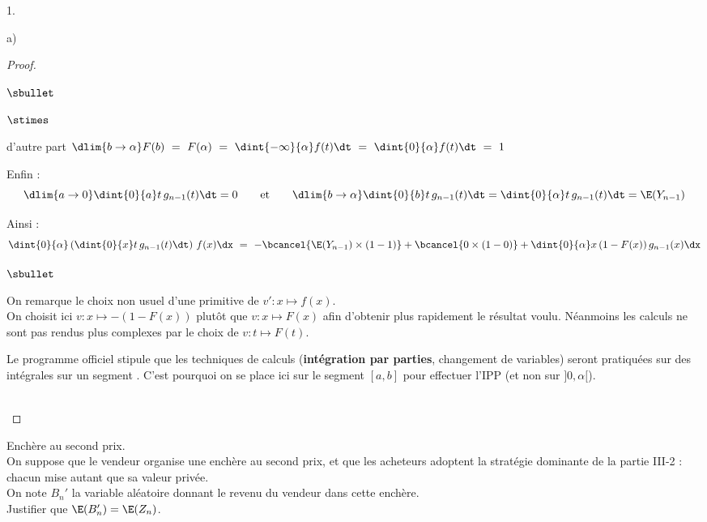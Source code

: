 \begin{noliste}{1.}
\begin{noliste}{a)}
\begin{proof}
\begin{noliste}{$\sbullet$}
\begin{noliste}{$\stimes$}
	\item d'autre part $\dlim{b\to \alpha} F(b) \ = \ F(\alpha) \ = 
	\ \dint{-\infty}{\alpha} f(t) \dt \ = \ 
	\dint{0}{\alpha} f(t) \dt \ = \ 1$
      \end{noliste}
      Enfin :
      \[
        \dlim{a\to 0} \dint{0}{a} t \, g_{n-1}(t) \dt = 0 \qquad 
        \text{et} \qquad \dlim{b\to \alpha} \dint{0}{b} t \, g_{n-1}(t) 
        \dt = \dint{0}{\alpha} t \, g_{n-1}(t) \dt = 
        \E(Y_{n-1})
      \]
      \item Ainsi : 
      \[
        \dint{0}{\alpha} \left(\dint{0}{x} t \, g_{n-1}(t) \dt \right)
        \, f(x) \dx \ = \ -\bcancel{\E(Y_{n-1}) \times (1-1)} + 
        \bcancel{0 \times (1-0)} + \dint{0}{\alpha} x \, (1-F(x))
        \, g_{n-1}(x) \dx
      \]
      \end{noliste}
      \conc{On en déduit : $\E(B_n) \ = \ n \, \dint{0}{\alpha} x \, 
      (1-F(x)) \, g_{n-1}(x) \dx$.}
      
      \begin{remark}
      \begin{noliste}{$\sbullet$}
        \item On remarque le choix non usuel d'une primitive de 
        $v': x \mapsto f(x)$.\\
        On choisit ici $v : x \mapsto -(1-F(x))$ plutôt que 
        $v:x \mapsto F(x)$ afin d'obtenir plus rapidement le résultat
        voulu. Néanmoins les calculs ne sont pas rendus plus 
        complexes par le choix de $v : t \mapsto F(t)$.
        \item Le programme officiel stipule que \og les techniques de 
        calculs ({\bf intégration par parties}, changement de variables)
        seront pratiquées sur des intégrales sur un segment \fg{}.
        C'est pourquoi on se place ici sur le segment $[a,b]$ pour 
        effectuer l'IPP (et non sur $]0, \alpha[$).
      \end{noliste}
      \end{remark}~\\[-1.4cm]
    \end{proof}
  \end{noliste}
  
  \item Enchère au second prix.\\
  On suppose que le vendeur organise une enchère au second prix, et que 
  les acheteurs adoptent la stratégie dominante de la partie III-2 : 
  chacun mise autant que sa valeur privée.\\
  On note $B_n'$ la variable aléatoire donnant le revenu du vendeur 
  dans cette enchère.\\
  Justifier que $\E(B_n') = \E(Z_n)$.
  

\end{noliste}
